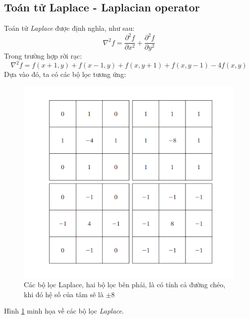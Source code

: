 \documentclass{article}
\begin{document}
    \subsection{Toán tử Laplace - Laplacian operator}
    Toán tử \textit{Laplace} được định nghĩa, như sau:
    $$ \nabla^2f = \frac{\partial^2 f}{\partial x^2} + \frac{\partial^2 f}{\partial y^2}$$
    Trong trường hợp rời rạc:
    $$ \nabla^2f = f(x+1,y) + f(x-1,y) + f(x,y+1) + f(x,y-1) - 4f(x,y) $$
    Dựa vào đó, ta có các bộ lọc tương ứng:
    \begin{figure}[ht!]
        \centering
        \includegraphics[width = 0.6\linewidth]{laplacian.png}
        \caption{Các bộ lọc Laplace, hai bộ lọc bên phải, là có tính cả đường chéo, khi đó hệ số của tâm sẽ là $\pm8$}
        \label{fig12}
    \end{figure}
    Hình \ref{fig12} minh họa về các bộ lọc \textit{Laplace}.
\end{document}
